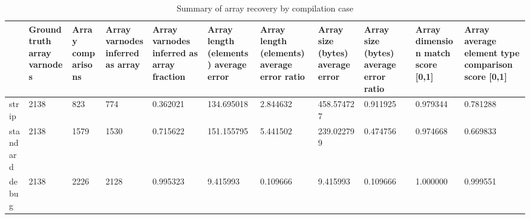 \begin{table}[t]
\centering
\caption{Summary of array recovery by compilation case}
\label{table:opts-array-comparisons-summary}
\begin{tabular}{lp{1.8cm}p{1.8cm}p{1.8cm}p{1.8cm}p{1.8cm}p{1.8cm}p{1.8cm}p{1.8cm}p{1.8cm}p{1.8cm}}
\toprule
{} &  Ground truth array varnodes &  Array comparisons &  Array varnodes inferred as array &  Array varnodes inferred as array fraction &  Array length (elements) average error &  Array length (elements) average error ratio &  Array size (bytes) average error &  Array size (bytes) average error ratio &  Array dimension match score [0,1] &  Array average element type comparison score [0,1] \\
\midrule
strip    &                         2138 &                823 &                               774 &                                   0.362021 &                             134.695018 &                                     2.844632 &                        458.574727 &                                0.911925 &                           0.979344 &                                           0.781288 \\
standard &                         2138 &               1579 &                              1530 &                                   0.715622 &                             151.155795 &                                     5.441502 &                        239.022799 &                                0.474756 &                           0.974668 &                                           0.669833 \\
debug    &                         2138 &               2226 &                              2128 &                                   0.995323 &                               9.415993 &                                     0.109666 &                          9.415993 &                                0.109666 &                           1.000000 &                                           0.999551 \\
\bottomrule
\end{tabular}
\end{table}

